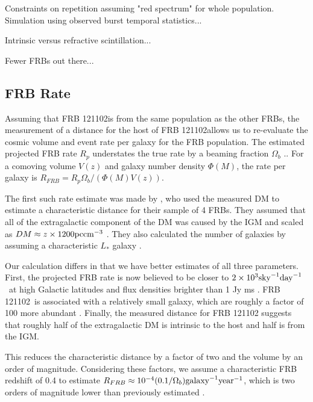 \documentclass[twocolumn]{aastex61}
\newcommand{\frb}{FRB 121102}
\begin{document}
Constraints on repetition assuming "red spectrum" for whole population. Simulation using observed burst temporal statistics...

Intrinsic versus refractive scintillation...

Fewer FRBs out there...


\subsection{FRB Rate}
Assuming that \frb is from the same population as the other FRBs, the measurement of a distance for the host of \frb allows us to re-evaluate the cosmic volume and event rate per galaxy for the FRB population. The estimated projected FRB rate $R_p$ understates the true rate by a beaming fraction $\Omega_b$ \citep[$\sim$10\%;][]{1998MNRAS.298..625T}.. For a comoving volume $V(z)$ and galaxy number density $\Phi(M)$, the rate per galaxy is $R_{FRB} = R_p \Omega_b /(\Phi(M)V (z))$. 

The first such rate estimate was made by \citet{2013Sci...341...53T}, who used the measured DM to estimate a characteristic distance for their sample of 4 FRBs. They assumed that all of the extragalactic component of the DM was caused by the IGM and scaled as $DM\approx z\times1200 \rm{pc} \rm{cm}^{-3}$ \citep{2003ApJ...598L..79I,2004MNRAS.348..999I}. They also calculated the number of galaxies by assuming a characteristic $L_*$ galaxy \citep[corresponding to stellar mass $M_* \approx 1010.66 M$][]{2012MNRAS.421..621B}.

Our calculation differs in that we have better estimates of all three parameters. First, the projected FRB rate is now believed to be closer to $2\times10^3 \rm{sky}^{-1} \rm{day}^{-1}$\ at high Galactic latitudes and flux densities brighter than 1 Jy ms \citep{2016arXiv161100458L,2016MNRAS.460L..30C}. \frb\ is associated with a relatively small galaxy, which are roughly a factor of 100 more abundant \citep[$\Phi(M) \approx 10^{-2} \rm{Mpc}^{-3}$][]{2007ApJ...665..265F}. Finally, the measured distance for FRB 121102 suggests that roughly half of the extragalactic DM is intrinsic to the host and half is from the IGM.

This reduces the characteristic distance by a factor of two and the volume by an order of magnitude. Considering these factors, we assume a characteristic FRB redshift of 0.4 to estimate $R_{FRB} \approx 10^{-4} (0.1/\Omega_b) \rm{galaxy}^{-1} \rm{year}^{-1}$, which is two orders of magnitude lower than previously estimated \citep[assuming isotropic radiation;]{2013Sci...341...53T}.
\end{document}
